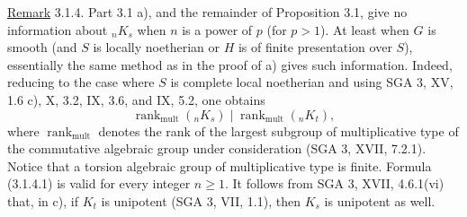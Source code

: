 \medskip
\noindent
\underline{Remark} 3.1.4.  Part 3.1 a), and the remainder of Proposition
3.1, give no information about ${}_nK_s$ when $n$ is a power of $p$ (for
$p>1$).  At least when $G$ is smooth (and $S$ is locally noetherian or $H$
is of finite presentation over $S$), essentially the same method as in the
proof of a) gives such information.  Indeed, reducing to the case where
$S$ is complete local noetherian and using SGA 3, XV, 1.6 c), X, 3.2, IX,
3.6, and IX, 5.2, one obtains
\begin{equation}\tag{3.1.4.1}
 \operatorname{rank}_{\mathrm{mult}}({}_nK_s)
 \mid
 \operatorname{rank}_{\mathrm{mult}}({}_nK_t),
\end{equation}
where $\operatorname{rank}_{\mathrm{mult}}$ denotes the rank of the largest
subgroup of multiplicative type of the commutative algebraic group under
consideration (SGA 3, XVII, 7.2.1).  Notice that a torsion algebraic group
of multiplicative type is finite.  Formula (3.1.4.1) is valid for every
integer $n\geq1$.  It follows from SGA 3, XVII, 4.6.1(vi) that, in c), if
$K_t$ is unipotent (SGA 3, VII, 1.1), then $K_s$ is unipotent as well.
